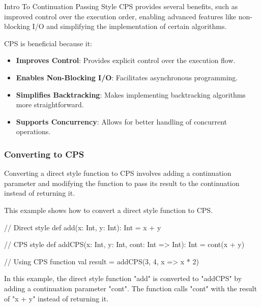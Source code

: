 \begin{notes}{Intro To Continuation Passing Style}
    CPS provides several benefits, such as improved control over the execution order, enabling advanced features like non-blocking I/O and simplifying the implementation of certain algorithms.
    
    \begin{highlight}
    
        CPS is beneficial because it:
    
        \begin{itemize}
            \item \textbf{Improves Control}: Provides explicit control over the execution flow.
            \item \textbf{Enables Non-Blocking I/O}: Facilitates asynchronous programming.
            \item \textbf{Simplifies Backtracking}: Makes implementing backtracking algorithms more straightforward.
            \item \textbf{Supports Concurrency}: Allows for better handling of concurrent operations.
        \end{itemize}
    
    \end{highlight}
    
    \subsubsection*{Converting to CPS}
    
    Converting a direct style function to CPS involves adding a continuation parameter and modifying the function to pass its result to the continuation instead of returning it.
    
    \begin{highlight}
    
        This example shows how to convert a direct style function to CPS.
    
    \begin{code}[Scala]
    // Direct style
    def add(x: Int, y: Int): Int = x + y
    
    // CPS style
    def addCPS(x: Int, y: Int, cont: Int => Int): Int = cont(x + y)
    
    // Using CPS function
    val result = addCPS(3, 4, x => x * 2)
    \end{code}
    
        In this example, the direct style function "add" is converted to "addCPS" by adding a continuation parameter "cont". The function calls "cont" with the result of "x + y" instead of returning it.
    

\end{highlight}
\end{notes}
